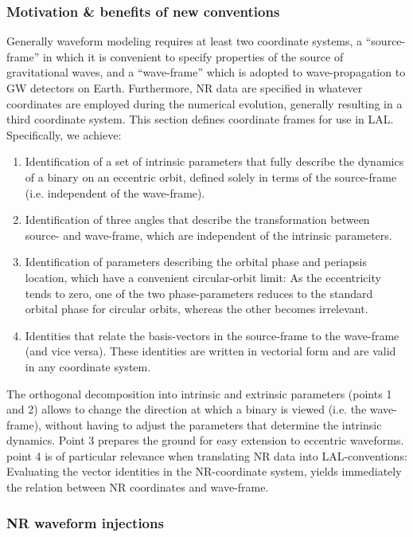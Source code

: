 \documentclass[11pt,tightenlines,article,amssymb,amsmath,amsfonts,superscriptaddress,nofootinbib]{revtex4}
\begin{document}
\subsubsection{Motivation \& benefits of new conventions}
Generally waveform modeling requires at least two coordinate
systems, a ``source-frame'' in which it is convenient to specify
properties of the source of gravitational waves, and a ``wave-frame''
which is adopted to wave-propagation to GW detectors on Earth.
Furthermore, NR data are specified in whatever
coordinates are employed during the numerical evolution, generally
resulting in a third coordinate system. This section defines coordinate frames 
for use in LAL. Specifically, we
achieve:
\begin{enumerate}
  \item Identification of a set of intrinsic parameters that fully
    describe the dynamics of a binary on an eccentric orbit,
    defined solely in terms of the source-frame (i.e. independent of
    the wave-frame).
  \item Identification of three angles that describe the
    transformation between source- and wave-frame, which are
    independent of the intrinsic parameters.
  \item Identification of parameters describing the orbital phase and
    periapsis location, which have a convenient circular-orbit limit:
    As the eccentricity tends to zero, one of the two phase-parameters
    reduces to the standard orbital phase for circular orbits, whereas
    the other becomes irrelevant.
  \item Identities that relate the basis-vectors in the source-frame to the
    wave-frame (and vice versa).  These identities are written in
    vectorial form and are valid in any coordinate system.
\end{enumerate}

The orthogonal decomposition into intrinsic and extrinsic parameters
(points 1 and 2) allows to change the direction at which a binary is
viewed (i.e. the wave-frame), without having to adjust the parameters
that determine the intrinsic dynamics.  Point 3 prepares the ground
for easy extension to eccentric waveforms.
point 4 is of particular relevance when translating NR data into
LAL-conventions: Evaluating the vector identities in the NR-coordinate
system, yields immediately the relation between NR coordinates and
wave-frame.


\subsubsection{NR waveform injections}
\end{document}
